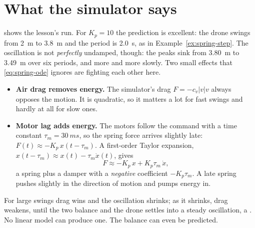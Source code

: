 \section{What the simulator says}


 shows the lesson's run. For $K_p = 10$ the prediction is excellent: the drone swings from \SI{2}{m} to \SI{3.8}{m} and the period is \SI{2.0}{s}, as in Example~\ref{ex:spring-step}. The oscillation is not \emph{perfectly} undamped, though: the peaks sink from \SI{3.80}{m} to \SI{3.49}{m} over six periods, and more and more slowly. Two small effects that \cref{eq:spring-ode} ignores are fighting each other here.

\begin{itemize}
  \item \textbf{Air drag removes energy.} The simulator's drag $F = -c_v|v|v$ always opposes the motion. It is quadratic, so it matters a lot for fast swings and hardly at all for slow ones.
  \item \textbf{Motor lag adds energy.} The motors follow the command with a time constant $\tau_m = \SI{30}{ms}$, so the spring force arrives slightly late: $F(t) \approx -K_p\,x(t - \tau_m)$. A first-order Taylor expansion, $x(t - \tau_m) \approx x(t) - \tau_m\dot x(t)$, gives
  \begin{equation}\label{eq:spring-lag}
    F \approx -K_p\,x + K_p\tau_m\,\dot x ,
  \end{equation}
  a spring plus a damper with a \emph{negative} coefficient $-K_p\tau_m$. A late spring pushes slightly in the direction of motion and pumps energy in.
\end{itemize}
For large swings drag wins and the oscillation shrinks; as it shrinks, drag weakens, until the two balance and the drone settles into a steady oscillation, a . No linear model can produce one. The balance can even be predicted.

